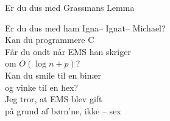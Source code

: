 \begin{song}{Er du dus med Grassmans Lemma}
  \begin{SBVerse}
    Er du dus med ham Igna– Ignat– Michael?\\
    Kan du programmere C\\
    Får du ondt når EMS han skriger\\
    om $O(\log n+p)$?\\
    Kan du smile til en binær\\
    og vinke til en hex?\\
    Jeg tror, at EMS blev gift\\
    på grund af børn’ne, ikke – sex
  \end{SBVerse}
\end{song}




